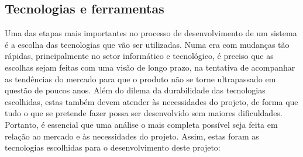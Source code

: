 \documentclass[12pt,a4paper]{article}
\begin{document}
\subsection{Tecnologias e ferramentas}
Uma das etapas mais importantes no processo de desenvolvimento de um sistema é a escolha das tecnologias que vão ser utilizadas. Numa era com mudanças tão rápidas, principalmente no setor informático e tecnológico, é preciso que as escolhas sejam feitas com uma visão de longo prazo, na tentativa de acompanhar as tendências do mercado para que o produto não se torne ultrapassado em questão de poucos anos. Além do dilema da durabilidade das tecnologias escolhidas, estas também devem atender às necessidades do projeto, de forma que tudo o que se pretende fazer possa ser desenvolvido sem maiores dificuldades. Portanto, é essencial que uma análise o mais completa possível seja feita em relação ao mercado e às necessidades do projeto. Assim, estas foram as tecnologias escolhidas para o desenvolvimento deste projeto:
\end{document}
